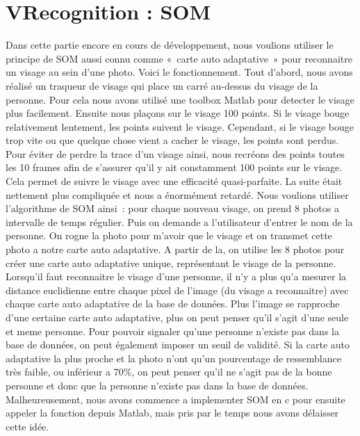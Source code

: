 \documentclass[12pt,a4paper]{article}
\begin{document}
\section{VRecognition : SOM}
Dans cette partie encore en cours de développement, nous voulions utiliser le principe de SOM aussi connu comme « carte auto adaptative » pour reconnaitre un visage au sein d’une photo. Voici le fonctionnement. Tout d’abord, nous avons réalisé un traqueur de visage qui place un carré au-dessus du visage de la personne. Pour cela nous avons utilisé une toolbox Matlab pour detecter le visage plus facilement. Ensuite nous plaçons sur le visage 100 points. Si le visage bouge relativement lentement, les points suivent le visage. Cependant, si le visage bouge trop vite ou que quelque chose vient a cacher le visage, les points sont perdus. Pour éviter de perdre la trace d’un visage ainsi, nous recréons des points toutes les 10 frames afin de s’assurer qu’il y ait constamment 100 points sur le visage. Cela permet de suivre le visage avec une efficacité quasi-parfaite. La suite était nettement plus compliquée et nous a énormément retardé. Nous voulions utiliser l’algorithme de SOM ainsi : pour chaque nouveau visage, on prend 8 photos a intervalle de temps régulier. Puis on demande a l’utilisateur d’entrer le nom de la personne. On rogne la photo pour m’avoir que le visage et on transmet cette photo a notre carte auto adaptative. A partir de la, on utilise les 8 photos pour créer une carte auto adaptative unique, représentant le visage de la personne. Lorsqu’il faut reconnaitre le visage d’une personne, il n’y a plus qu’a mesurer la distance euclidienne entre chaque pixel de l’image (du visage a reconnaitre) avec chaque carte auto adaptative de la base de données. Plus l’image se rapproche d’une certaine carte auto adaptative, plus on peut penser qu’il s’agit d’une seule et meme personne. Pour pouvoir signaler qu’une personne n’existe pas dans la base de données, on peut également imposer un seuil de validité. Si la carte auto adaptative la plus proche et la photo n’ont qu’un pourcentage de ressemblance très faible, ou inférieur a 70\%, on peut penser qu’il ne s’agit pas de la bonne personne et donc que la personne n’existe pas dans la base de données. Malheureusement, nous avons commence a implementer SOM en c pour ensuite appeler la fonction depuis Matlab, mais pris par le temps nous avons  délaisser cette idée.
\end{document}
